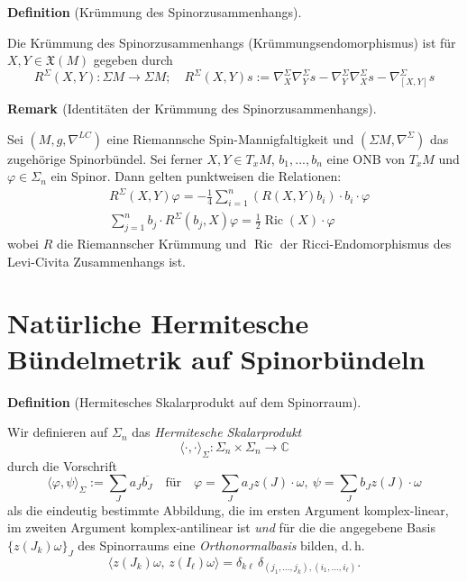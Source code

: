 \documentclass[10pt, letterpaper]{article}
\newcommand{\C}{\mathbb{C}}
\newcommand{\CustomHeading}[3]{%
  \par\medskip\noindent%
  \textbf{#1 #2} \textnormal{(#3)}.\enskip%
}
\newenvironment{DEF}[2]{\CustomHeading{Definition}{#1}{#2}}{}
\newenvironment{REM}[2]{\CustomHeading{Remark}{#1}{#2}}{}
\begin{document}
\begin{DEF}{}{Krümmung des Spinorzusammenhangs}
  Die Krümmung des Spinorzusammenhangs (Krümmungsendomorphismus) ist für $X,Y\in\mathfrak{X}(M)$ gegeben durch 
    $$R^{\Sigma}(X, Y): \Sigma M \rightarrow \Sigma M;\quad R^{\Sigma}(X, Y) s:=\nabla_X^{\Sigma} \nabla_Y^{\Sigma} s-\nabla_Y^{\Sigma} \nabla_X^{\Sigma} s-\nabla_{[X, Y]}^{\Sigma} s$$
\end{DEF}


\begin{REM}{\parencite[104,108]{BaerSpin}}{Identitäten der Krümmung des Spinorzusammenhangs}
  Sei $(M,g,\nabla^{LC})$ eine Riemannsche Spin-Mannigfaltigkeit und $(\Sigma M,\nabla^\Sigma)$ das zugehörige Spinorbündel. Sei ferner $X,Y\in T_x M$, $b_1,...,b_n$ eine ONB von $T_xM$ und $\varphi\in \Sigma_n$ ein Spinor. Dann gelten punktweisen die Relationen:
  $$
  \begin{aligned}
    &R^{\Sigma}(X, Y) \varphi =-\frac{1}{4} \sum_{i=1}^n\left(R(X, Y) b_i\right) \cdot b_i \cdot \varphi\\
    &\sum_{j=1}^n b_j \cdot R^{\Sigma}\left(b_j, X\right) \varphi=\frac{1}{2} \operatorname{Ric}(X) \cdot \varphi
  \end{aligned}
  $$
  wobei $R$ die Riemannscher Krümmung und $\operatorname{Ric}$ der Ricci-Endomorphismus des Levi-Civita Zusammenhangs ist. 
\end{REM}



\section{Natürliche Hermitesche Bündelmetrik auf Spinorbündeln}



\begin{DEF}{}{Hermitesches Skalarprodukt auf dem Spinorraum}
Wir definieren auf $\Sigma_n$ das \emph{Hermitesche Skalarprodukt}
\[
\langle\cdot,\cdot\rangle_\Sigma:\Sigma_n\times \Sigma_n\to \C
\]
durch die Vorschrift 
$$\langle\varphi, \psi\rangle_{\Sigma}:=\sum_J a_J \overline{b_J} \quad \text{für} \quad \varphi=\sum_J a_J z(J)\cdot\omega,\ \psi=\sum_J b_J z(J)\cdot\omega$$
als die eindeutig bestimmte Abbildung, die im ersten Argument komplex-linear, im zweiten Argument komplex-antilinear ist \emph{und} für die die angegebene Basis $\{z(J_k)\omega\}_J$ des Spinorraums eine \emph{Orthonormalbasis} bilden, d.\,h.
\[
\bigl\langle z(J_k)\omega,\, z(I_\ell)\omega\bigr\rangle
=
\delta_{k\ell}\,\delta_{(j_1,\dots,j_k),(i_1,\dots,i_\ell)}.
\]
\end{DEF}
\end{document}
